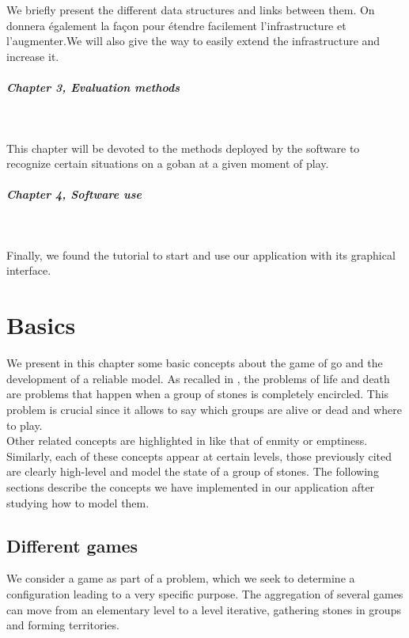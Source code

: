 \documentclass[a4paper,10pt,twoside]{report}
\begin{document}
	We briefly present the different data structures and links between them. On donnera également la façon pour étendre facilement l'infrastructure et l'augmenter.We will also give the way to easily extend the infrastructure and increase it.

	\paragraph{Chapter 3, \emph{Evaluation methods}}
	~~\vspace{2mm}
	
	This chapter will be devoted to the methods deployed by the software to recognize certain situations on a goban at a given moment of play.

	\paragraph{Chapter 4, \emph{Software use}}
	~~\vspace{2mm}
	
	Finally, we found the tutorial to start and use our application with its graphical interface.


\chapter{Basics}

	We present in this chapter some basic concepts about the game of go and the development of a reliable model. As recalled in \cite{Bouzy2001}, the problems of life and death are problems that happen when a group of stones is completely encircled. This problem is crucial since it allows to say which groups are alive or dead and where to play.\\

	Other related concepts are highlighted in \cite{Bouzy95} like that of enmity or emptiness. Similarly, each of these concepts appear at certain levels, those previously cited are clearly high-level and model the state of a group of stones. The following sections describe the concepts we have implemented in our application after studying how to model them.

\section{Different games}
\vspace{4mm}


	We consider a game as part of a problem, which we seek to determine a configuration leading to a very specific purpose. The aggregation of several games can move from an elementary level to a  level iterative, gathering stones in groups and forming territories.\\
\end{document}
